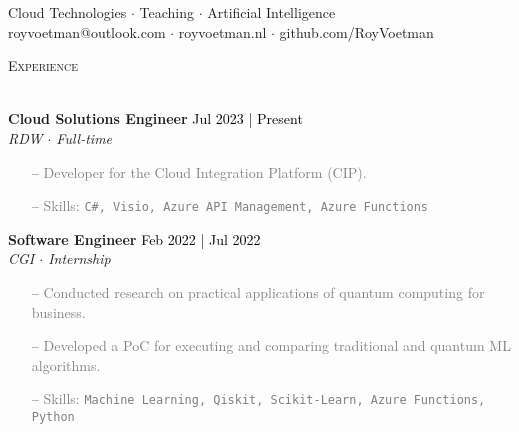 \documentclass[a4paper]{article}
\newcommand{\lineunder} {
    \vspace*{-8pt} \\
    \hspace*{-18pt} \hrulefill \\
}
\newcommand{\header} [1] {
    {\hspace*{-18pt}\vspace*{6pt} \textsc{#1}}
    \vspace*{-6pt} \lineunder
}
\newcommand{\roundpic}[4][]{
  \tikz\node [circle, minimum width = #2,
    path picture = {
      \node [#1] at (path picture bounding box.center) {
        \texttt{[image: \#4]}};
    }] {};}
\begin{document}
\vspace*{-40pt}

    

\vspace*{-10pt}

\vspace{10mm}

\begin{center}
    \centering
    \raisebox{-0.5\height}{\roundpic{2.5cm}{2.5cm}{avatar1.jpeg}}
    \hspace*{.1in}
    
    \vspace*{10pt}
    {Cloud Technologies $\cdot$ Teaching $\cdot$ Artificial Intelligence}\\
    \vspace*{3pt}
	royvoetman@outlook.com $\cdot$ royvoetman.nl $\cdot$ github.com/RoyVoetman\\
\end{center}

\vspace{5mm}

\header{Experience}
\vspace{1mm}

\textbf{Cloud Solutions Engineer} \hfill \textcolor{black}{Jul 2023 | Present}\\
\textit{RDW $\cdot$ Full-time}\\
\vspace{-1mm}
\begin{itemize} \itemsep 1pt
    \item[--] \textcolor{gray}{Developer for the Cloud Integration Platform (CIP).}
    \item[--] \textcolor{gray}{Skills: \texttt{C\#, Visio, Azure API Management, Azure Functions}}
\end{itemize}

\textbf{Software Engineer} \hfill \textcolor{black}{Feb 2022 | Jul 2022}\\
\textit{CGI $\cdot$ Internship}\\
\vspace{-1mm}
\begin{itemize} \itemsep 1pt
    \item[--] \textcolor{gray}{Conducted research on practical applications of quantum computing for business.}
    \item[--] \textcolor{gray}{Developed a PoC for executing and comparing traditional and quantum ML algorithms.}
    \item[--] \textcolor{gray}{Skills: \texttt{Machine Learning, Qiskit, Scikit-Learn, Azure Functions, Python}}
\end{itemize}
\end{document}
